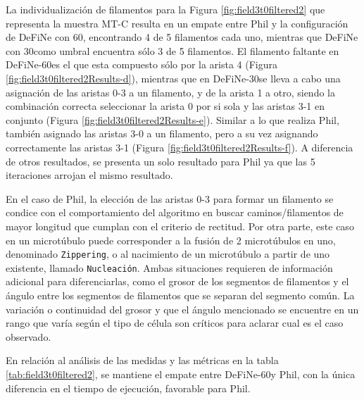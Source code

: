 La individualizaci\'on de filamentos para la Figura \ref{fig:field3t0filtered2} que representa la muestra MT-C resulta en un empate entre Phil y la configuraci\'on de DeFiNe con 60\textdegree, encontrando 4 de 5 filamentos cada uno, mientras que DeFiNe con 30\textdegree como umbral encuentra s\'olo 3 de 5 filamentos. El filamento faltante en DeFiNe-60\textdegree es el que esta compuesto s\'olo por la arista 4 (Figura \ref{fig:field3t0filtered2Results-d}), mientras que en DeFiNe-30\textdegree se lleva a cabo una asignaci\'on de las aristas 0-3 a un filamento, y de la arista 1 a otro, siendo la combinaci\'on correcta seleccionar la arista 0 por si sola y las aristas 3-1 en conjunto (Figura \ref{fig:field3t0filtered2Results-e}). Similar a lo que realiza Phil, tambi\'en asignado las aristas 3-0 a un filamento, pero a su vez asignando correctamente las aristas 3-1 (Figura \ref{fig:field3t0filtered2Results-f}).  A diferencia de otros resultados, se presenta un solo resultado para Phil ya que las 5 iteraciones arrojan el mismo resultado.


En el caso de Phil, la elecci\'on de las aristas 0-3 para formar un filamento se condice con el comportamiento del algoritmo en buscar caminos/filamentos de mayor longitud que cumplan con el criterio de rectitud. Por otra parte, este caso en un microt\'ubulo puede corresponder a la fusi\'on de 2 microt\'ubulos en uno, denominado {\tt Zippering}, o al nacimiento de un microt\'ubulo a partir de uno existente, llamado {\tt Nucleaci\'on}. Ambas situaciones requieren de informaci\'on adicional para diferenciarlas, como el grosor de los segmentos de filamentos y el \'angulo entre los segmentos de filamentos que se separan del segmento com\'un. La variaci\'on o continuidad del grosor y que el \'angulo mencionado se encuentre en un rango que var\'ia seg\'un el tipo de c\'elula son cr\'iticos para aclarar cual es el caso observado. 

En relaci\'on al an\'alisis de las medidas y las m\'etricas en la tabla \ref{tab:field3t0filtered2}, se mantiene el empate entre DeFiNe-60\textdegree y Phil, con la \'unica diferencia en el tiempo de ejecuci\'on, favorable para Phil. 

